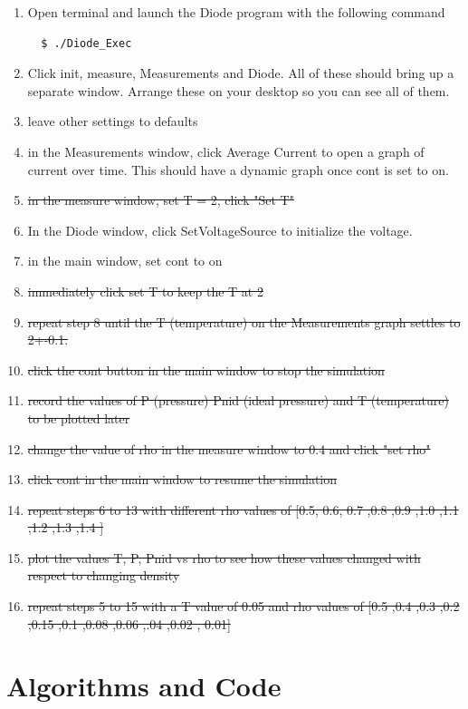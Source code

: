\documentclass[a4paper]{article}
\begin{document}
\begin{enumerate}
\item Open terminal and launch the Diode program with the following command
\begin{verbatim}
  $ ./Diode_Exec
\end{verbatim}
\item Click init, measure, Measurements and Diode. All of these should bring up a separate window. Arrange these on your desktop so you can see all of them.
\item leave other settings to defaults
\item in the Measurements window, click Average Current to open a graph of current over time. This should have a dynamic graph once cont is set to on.
\item {\sout{ in the measure window, set T = 2, click "Set T"}}
\item In the Diode window, click SetVoltageSource to initialize the voltage.
\item in the main window, set cont to on
\item {\sout{ immediately click set T to keep the T at 2}}
\item {\sout{ repeat step 8 until the T (temperature) on the Measurements graph settles to 2+-0.1.}}
\item {\sout{ click the cont button in the main window to stop the simulation}}
\item {\sout{ record the values of P (pressure) Pnid (ideal pressure) and T (temperature) to be plotted later}}
\item {\sout{ change the value of rho in the measure window to 0.4 and click "set rho"}}
\item {\sout{ click cont in the main window to resume the simulation}}
\item {\sout{ repeat steps 6 to 13 with different rho values of [0.5, 0.6, 0.7 ,0.8 ,0.9 ,1.0 ,1.1 ,1.2 ,1.3 ,1.4 ]}}
\item {\sout{ plot the values T, P, Pnid vs rho to see how these values changed with respect to changing density}}
\item {\sout{ repeat steps 5 to 15 with a T value of 0.05 and rho values of [0.5 ,0.4     ,0.3   ,0.2   ,0.15   ,0.1    ,0.08   ,0.06   ,.04   ,0.02     ,   0.01]}}
\end{enumerate}
\section{Algorithms and Code}
\paragraph{}
\end{document}
